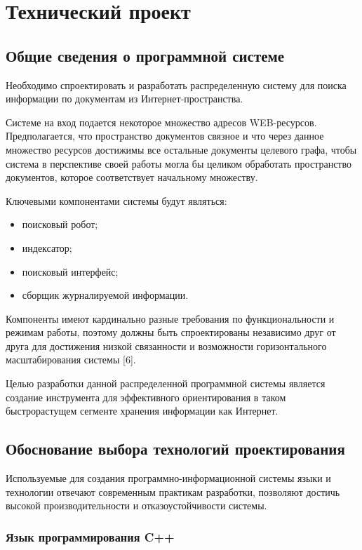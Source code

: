 \section{Технический проект}

\subsection{Общие сведения о программной системе}
Необходимо спроектировать и разработать распределенную систему для поиска информации по документам из Интернет-пространства.

Системе на вход подается некоторое множество адресов WEB-ресурсов.
Предполагается, что пространство документов связное и что через данное множество ресурсов достижимы все остальные документы целевого графа, чтобы система в перспективе своей работы могла бы целиком обработать пространство документов, которое соответствует начальному множеству.

Ключевыми компонентами системы будут являться:
\begin{itemize}
\item поисковый робот;
\item индексатор;
\item поисковый интерфейс;
\item сборщик журналируемой информации.
\end{itemize}

Компоненты имеют кардинально разные требования по функциональности и режимам работы, поэтому должны быть спроектированы независимо друг от друга для достижения низкой связанности и возможности горизонтального масштабирования системы [6].

Целью разработки данной распределенной программной системы является создание инструмента для эффективного ориентирования в таком быстрорастущем сегменте хранения информации как Интернет.

\subsection{Обоснование выбора технологий проектирования}
Используемые для создания программно-информационной системы языки и технологии отвечают современным практикам разработки, позволяют достичь высокой производительности и отказоустойчивости системы.

\subsubsection{Язык программирования C++}

